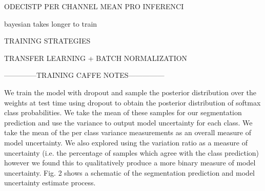 ODECISTP PER CHANNEL MEAN PRO INFERENCI

bayesian takes longer to train

TRAINING STRATEGIES

TRANSFER LEARNING + BATCH NORMALIZATION

--------------TRAINING CAFFE NOTES---------------


We train the model with dropout and sample the posterior distribution over the weights at test time using dropout
to obtain the posterior distribution of softmax class probabilities. We take the mean of these samples for our segmentation prediction and use the variance to output model
uncertainty for each class. We take the mean of the per class
variance measurements as an overall measure of model uncertainty. We also explored using the variation ratio as
a measure of uncertainty (i.e. the percentage of samples
which agree with the class prediction) however we found
this to qualitatively produce a more binary measure of
model uncertainty. Fig. 2 shows a schematic of the segmentation prediction and model uncertainty estimate process.